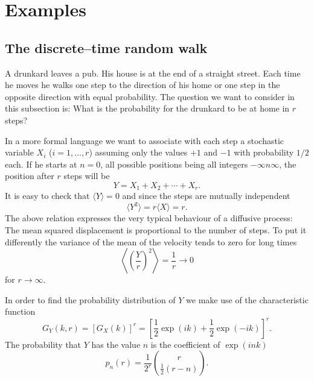 \section{Examples}

\subsection{The discrete--time random walk}
A drunkard leaves a pub. His house is at the end of a straight
street. Each time  he moves he walks one
step to the direction of his home  or one step in the opposite direction
with equal probability. The question we want to consider in this 
subsection is: What is the probability for the drunkard to be at 
home in $r$ steps? 

In a more formal language we want to associate with each step
a stochastic variable $X_i$ ($i=1,\ldots,r$) assuming only the 
values $+1$ and $-1$ with probability $1/2$ each. If he starts at
$n=0$, all possible positions being all integers $-\infty n 
\infty$, the position after $r$ steps will be
\begin{equation*}
Y = X_1 + X_2 + \cdots + X_r.
\end{equation*}
It is easy to check that $\langle Y \rangle = 0$ and since
the steps are mutually independent
\begin{equation*}
\langle Y^2 \rangle = r \langle X \rangle = r.
\end{equation*}
The above relation expresses the very typical behaviour of a 
diffusive process: The mean squared displacement is proportional 
to the number of steps. To put it differently the variance of the 
mean of the velocity tends to zero  for long times
\begin{equation*}
\left\langle \left( \frac{Y}{r}\right)^2\right\rangle =
\frac{1}{r} \longrightarrow 0
\end{equation*}
for $r \longrightarrow \infty$.

In order to find the probability distribution of $Y$ we make use
of the characteristic function
\begin{equation*}
G_Y(k,r) = [G_X(k)]^r = [\frac{1}{2}\exp(ik) + 
                   \frac{1}{2}\exp(-ik)]^r.
\end{equation*}
The probability that $Y$ has the value $n$ is the coefficient
of $\exp(ink)$
\begin{equation*}
p_n(r) = \frac{1}{2^r} {r \choose {\frac{1}{2} (r-n)}}.
\end{equation*}

